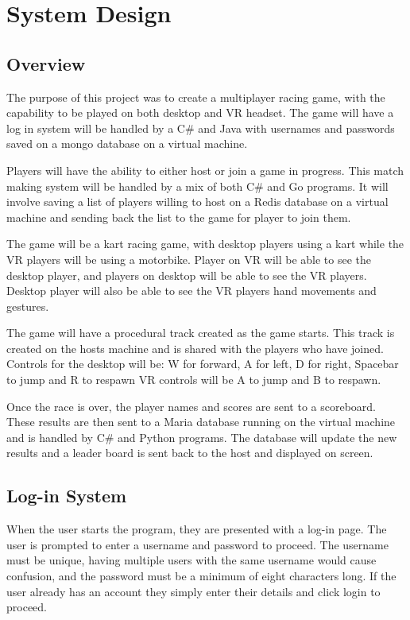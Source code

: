 
\chapter{System Design}
\section{Overview}
The purpose of this project was to create a multiplayer racing game, with the capability to be played on both desktop and VR headset. The game will have a log in system will be handled by a C# and Java with usernames and passwords saved on a mongo database on a virtual machine.
\newline

Players will have the ability to either host or join a game in progress. This match making system will be handled by a mix of both C# and Go programs. It will involve saving a list of players willing to host on a Redis database on a virtual machine and sending back the list to the game for player to join them.
\newline

The game will be a kart racing game, with desktop players using a kart while the VR players will be using a motorbike. Player on VR will be able to see the desktop player, and players on desktop will be able to see the VR players. Desktop player will also be able to see the VR players hand movements and gestures.
\newline

The game will have a procedural track created as the game starts. This track is created on the hosts machine and is shared with the players who have joined. Controls for the desktop will be:
W for forward, A for left, D for right, Spacebar to jump and R to respawn 
VR controls will be A to jump and B to respawn.
\newline

Once the race is over, the player names and scores are sent to a scoreboard. These results are then sent to a Maria database running on the virtual machine and is handled by C\# and Python programs. The database will update the new results and a leader board is sent back to the host and displayed on screen.

\section{Log-in System}
When the user starts the program, they are presented with a log-in page. The user is prompted to enter a username and password to proceed. The username must be unique, having multiple users with the same username would cause confusion, and the password must be a minimum of eight characters long. If the user already has an account they simply enter their details and click login to proceed.
\newline 

